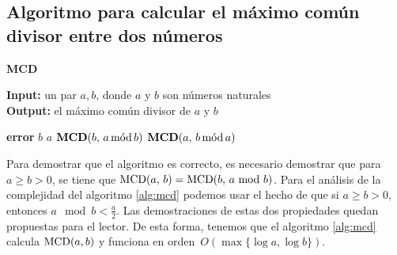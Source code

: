 \subsection{Algoritmo para calcular el máximo común divisor entre dos números}
\label{app-mcd}
\begin{algorithm}[H]
\caption{\quad\textbf{MCD}}
\label{alg:mcd}
\hspace*{\algorithmicindent} \textbf{Input:} un par $a,b$, donde $a$ y $b$ son números naturales\\
\hspace*{\algorithmicindent} \textbf{Output:} el máximo común divisor de $a$ y $b$
\begin{algorithmic}[1]
    	\RETURN \textbf{error}
    	\RETURN $b$
    	\RETURN $a$
    	\RETURN $\textbf{MCD}(b,\, a \mods b)$
	\ELSE
		\RETURN $\textbf{MCD}(a,\, b \mods a)$    	
   	\ENDIF
\end{algorithmic}
\end{algorithm}
Para demostrar que el algoritmo es correcto, es necesario demostrar que para $a \geq b > 0$, se tiene que $\MCD(a,\, b) = \MCD(b,\, a \!\! \mod b)$. 
Para el análisis de la complejidad del algoritmo \ref{alg:mcd} podemos usar el hecho de que si $a\geq b > 0$, entonces $a \!\! \mod b<\frac{a}{2}$. Las demostraciones de estas dos propiedades quedan propuestas para el lector. De esta forma, 
tenemos que el algoritmo \ref{alg:mcd} calcula $\MCD(a,b)$ 
y funciona en orden~$O(\max\{\log a,\log b\})$.


